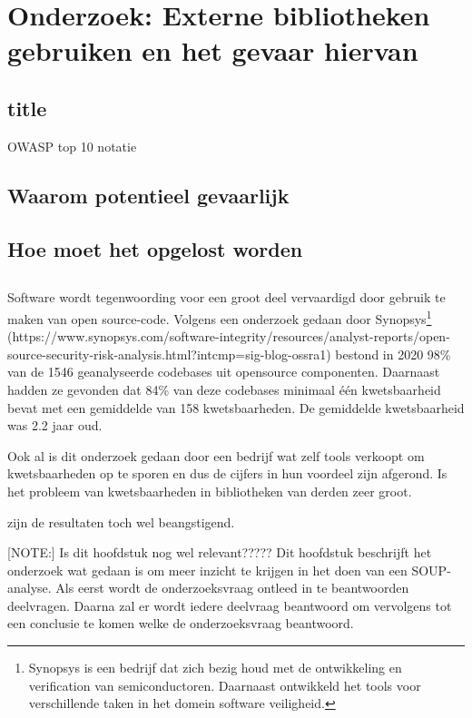 \chapter{Onderzoek: Externe bibliotheken gebruiken en het gevaar hiervan}\label{ch:externeGevaren}

\section{title}
OWASP top 10 notatie

\section{Waarom potentieel gevaarlijk}

\section{Hoe moet het opgelost worden}


\section{}

Software wordt tegenwoording voor een groot deel vervaardigd door gebruik te maken van open source-code. Volgens een onderzoek gedaan door Synopsys\footnote{Synopsys is een bedrijf dat zich bezig houd met de ontwikkeling en verification van semiconductoren. Daarnaast ontwikkeld het tools voor verschillende taken in het domein software veiligheid. } (https://www.synopsys.com/software-integrity/resources/analyst-reports/open-source-security-risk-analysis.html?intcmp=sig-blog-ossra1) bestond in 2020 98\% van de 1546 geanalyseerde codebases uit opensource componenten. Daarnaast hadden ze gevonden dat 84\% van deze codebases minimaal één kwetsbaarheid bevat met een gemiddelde van 158 kwetsbaarheden. De gemiddelde kwetsbaarheid was 2.2 jaar oud.

Ook al is dit onderzoek gedaan door een bedrijf wat zelf tools verkoopt om kwetsbaarheden op te sporen en dus de cijfers in hun voordeel zijn afgerond. Is het probleem van kwetsbaarheden in bibliotheken van derden zeer groot.



zijn de resultaten toch wel beangstigend.



[NOTE:] Is dit hoofdstuk nog wel relevant?????
Dit hoofdstuk beschrijft het onderzoek wat gedaan is om meer inzicht te krijgen in het doen van een SOUP-analyse. Als eerst wordt de onderzoeksvraag ontleed in te beantwoorden deelvragen. Daarna zal er wordt iedere deelvraag beantwoord om vervolgens tot een conclusie te komen welke de onderzoeksvraag beantwoord.


